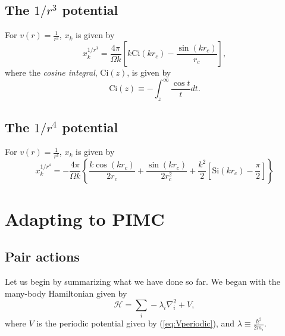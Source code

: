 \documentclass{article}
\begin{document}
\subsection{The $1/r^3$ potential}
For $v(r) = \frac{1}{r^3}$, $x_k$ is given by
\begin{equation}
x_k^{1/r^3} = \frac{4\pi}{\Omega k} 
\left[k\text{Ci}(k r_c) - \frac{\sin(k r_c)}{r_c} \right],
\end{equation}
where the {\em cosine integral}, $\text{Ci}(z)$, is given by
\begin{equation}
\text{Ci}(z) \equiv -\int_z^\infty \frac{\cos t}{t} dt.
\end{equation}

\subsection{The $1/r^4$ potential}
For $v(r) = \frac{1}{r^4}$, $x_k$ is given by
\begin{equation}
x_k^{1/r^4} = -\frac{4 \pi}{\Omega k} 
\left\{
\frac{k \cos(k r_c)}{2 r_c} + \frac{\sin(k r_c)}{2r_c^2} + \frac{k^2}{2} \left[ \text{Si}(k r_c) - \frac{\pi}{2}\right]\right\}
\end{equation}


\section{Adapting to PIMC}
\subsection{Pair actions}
Let us begin by summarizing what we have done so far.  We began with the many-body Hamiltonian given by 
\begin{equation}
\mathcal{H} = \sum_i -\lambda_i \nabla_i^2 + V,
\end{equation}
where $V$ is the periodic potential given by (\ref{eq:Vperiodic}), and $\lambda \equiv \frac{\hbar^2}{2m_i}$. 
\end{document}
